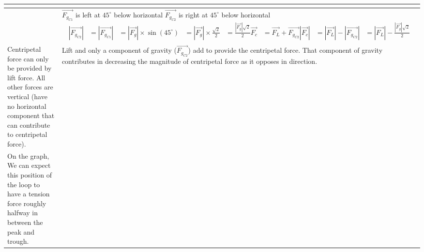 \documentclass[11pt, a4paper]{article}
\begin{document}
\begin{table}[H]
\begin{tabularx}{\textwidth}{|>{\raggedright\arraybackslash}X|||>{\raggedright\arraybackslash}X|}
\begin{center}
\begin{tikzpicture}
				\end{tikzpicture}
			\end{center}\\
			\hline
			\parbox{0.45\textwidth}{
				\begin{align}
					\vec{F_c} &= \vec{F_L} \\
					|\vec{F_c}| &= |\vec{F_L}|
				\end{align}
			}
			&
			\parbox{0.45\textwidth}{
				\vspace{10pt}
				$\vec{F_{g_{C1}}}$ is left at $45^\circ$ below horizontal \\
				$\vec{F_{g_{C2}}}$ is right at $45^\circ$ below horizontal
				\begin{align}
					|\vec{F_{g_{C2}}}| &= |\vec{F_{g_{C1}}}| \\
					&= |\vec{F_g}| \times \sin (45^\circ) \\
					&= |\vec{F_g}| \times \frac{\sqrt{2}}{2} \\
					&= \frac{|\vec{F_g}|\sqrt{2}}{2} \\[20pt]
					\vec{F_c} &= \vec{F_L} + \vec{F_{g_{C2}}} \\
					|\vec{F_c}| &= |\vec{F_L}| - |\vec{F_{g_{C2}}}| \\
					&= |\vec{F_L}| - \frac{|\vec{F_g}|\sqrt{2}}{2}
				\end{align}
			}\\
			\hline
			Centripetal force can only be provided by lift force. All other forces are vertical (have no horizontal component that can contribute to centripetal force).
			&
			Lift and only a component of gravity ($\vec{F_{g_{C2}}}$) add to provide the centripetal force. That component of gravity contributes in decreasing the magnitude of centripetal force as it opposes in direction.\\
			\hline
			On the graph, We can expect this position of the loop to have a tension force roughly halfway in between the peak and trough. %

\end{tabularx}
\end{table}
\end{document}
